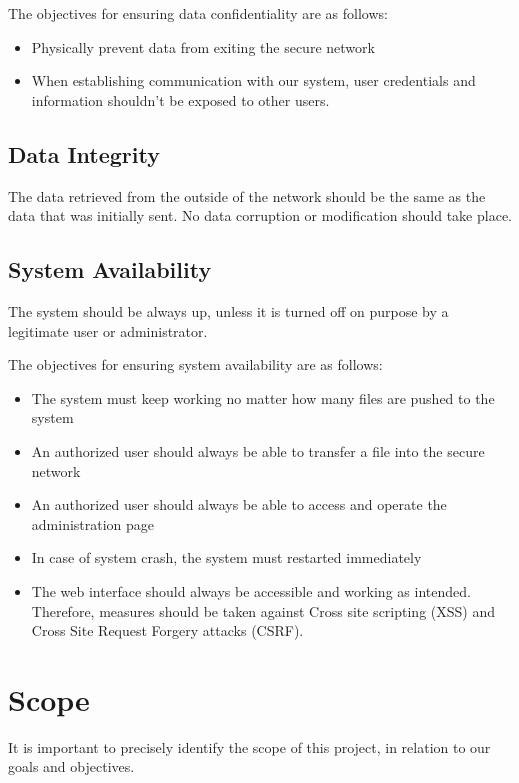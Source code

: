\documentclass[a4paper,11pt]{article}
\begin{document}
The objectives for ensuring data confidentiality are as follows:

\begin{itemize}
\item{Physically prevent data from exiting the secure network}
\item{When establishing communication with our system, user credentials and information shouldn't be exposed to other users.}
\end{itemize}

\subsection{Data Integrity}
The data retrieved from the outside of the network should be the same as the data that was initially sent. No data corruption or modification should take place.

\subsection{System Availability}
The system should be always up, unless it is turned off on purpose by a legitimate user or administrator.

The objectives for ensuring system availability are as follows:

\begin{itemize}
\item{The system must keep working no matter how many files are pushed to the system}
\item{An authorized user should always be able to transfer a file into the secure network}
\item{An authorized user should always be able to access and operate the administration page}
\item{In case of system crash, the system must restarted immediately}
\item{The web interface should always be accessible and working as intended. Therefore, measures should be taken against Cross site scripting (XSS) and Cross Site Request Forgery attacks (CSRF).}

\end{itemize}


\section{Scope}
It is important to precisely identify the scope of this project, in relation to our goals and objectives.\\
\end{document}
